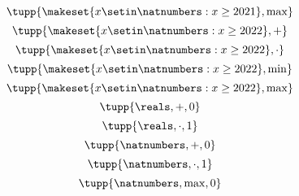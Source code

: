 {\begin{forslides}
\begin{equation}
            \tupp{ \makeset{x\setin\natnumbers: x \geq 2021 }, \max}
        \end{equation}
        \begin{equation}
            \label{eq:example-nats22-plus}
            \tupp{ \makeset{x\setin\natnumbers: x \geq 2022 }, +}
        \end{equation}
        \begin{equation}
            \label{eq:example-nats22-mult}
            \tupp{ \makeset{x\setin\natnumbers: x \geq 2022 }, \cdot}
        \end{equation}
        \begin{equation}
            \label{eq:example-nats22-min}
            \tupp{ \makeset{x\setin\natnumbers: x \geq 2022 }, \min}
        \end{equation}
        \begin{equation}
            \label{eq:example-nats22-max}
            \tupp{ \makeset{x\setin\natnumbers: x \geq 2022 }, \max}
        \end{equation}
        \begin{equation}
            \label{eq:example-monoid-reals-plus-zero}
            \tupp{\reals, {{+}}, 0}
        \end{equation}
        \begin{equation}
            \label{eq:example-monoid-reals-mult-one}
            \tupp{\reals, {{\cdot}}, 1}
        \end{equation}
        \begin{equation}
            \label{eq:example-monoid-nats-plus-zero}
            \tupp{\natnumbers, {{+}}, 0}
        \end{equation}
        \begin{equation}
            \label{eq:example-monoid-nats-mult-one}
            \tupp{\natnumbers, {{\cdot}},  1}
        \end{equation}
        \begin{equation}
            \label{eq:example-monoid-nats-max-zero}
            \tupp{\natnumbers, \max, 0}
        \end{equation}
    \end{forslides}
}
